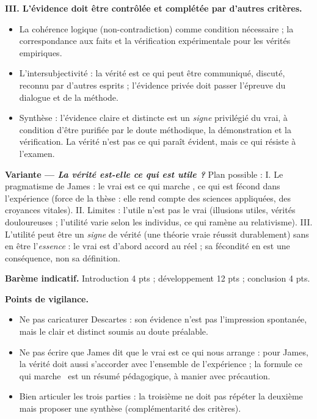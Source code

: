 \documentclass[11pt]{article}
\begin{document}
\begin{corrige}
\textbf{III. L'évidence doit être contrôlée et complétée par d'autres critères.}
\begin{itemize}
\item La cohérence logique (non-contradiction) comme condition nécessaire ; la correspondance aux faits et la vérification expérimentale pour les vérités empiriques.
\item L'intersubjectivité : la vérité est ce qui peut être communiqué, discuté, reconnu par d'autres esprits ; l'évidence privée doit passer l'épreuve du dialogue et de la méthode.
\item Synthèse : l'évidence claire et distincte est un \emph{signe} privilégié du vrai, à condition d'être purifiée par le doute méthodique, la démonstration et la vérification. La vérité n'est pas ce qui paraît évident, mais ce qui résiste à l'examen.
\end{itemize}

\textbf{Variante — \emph{La vérité est-elle ce qui est utile ?}} Plan possible : I. Le pragmatisme de James : le vrai est ce qui \guillemotleft marche \guillemotright, ce qui est fécond dans l'expérience (force de la thèse : elle rend compte des sciences appliquées, des croyances vitales). II. Limites : l'utile n'est pas le vrai (illusions utiles, vérités douloureuses ; l'utilité varie selon les individus, ce qui ramène au relativisme). III. L'utilité peut être un \emph{signe} de vérité (une théorie vraie réussit durablement) sans en être l'\emph{essence} : le vrai est d'abord accord au réel ; sa fécondité en est une conséquence, non sa définition.

\textbf{Barème indicatif.} Introduction 4 pts ; développement 12 pts ; conclusion 4 pts.

\textbf{Points de vigilance.}
\begin{itemize}
\item Ne pas caricaturer Descartes : son évidence n'est pas l'impression spontanée, mais le clair et distinct soumis au doute préalable.
\item Ne pas écrire que \guillemotleft James dit que le vrai est ce qui nous arrange \guillemotright : pour James, la vérité doit aussi s'accorder avec l'ensemble de l'expérience ; la formule \guillemotleft ce qui marche \guillemotright\ est un résumé pédagogique, à manier avec précaution.
\item Bien articuler les trois parties : la troisième ne doit pas répéter la deuxième mais proposer une synthèse (complémentarité des critères).
\end{itemize}
\end{corrige}
\end{document}
